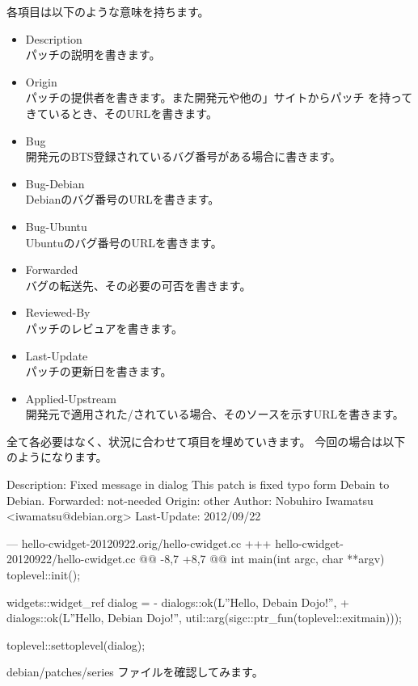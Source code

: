 \documentclass[mingoth,a4paper]{jsarticle}
\begin{document}
各項目は以下のような意味を持ちます。
\begin{itemize}
\item Description\\
パッチの説明を書きます。
\item Origin\\
パッチの提供者を書きます。また開発元や他の」サイトからパッチ
を持ってきているとき、そのURLを書きます。
\item Bug\\
開発元のBTS登録されているバグ番号がある場合に書きます。
\item Bug-Debian\\
Debianのバグ番号のURLを書きます。
\item Bug-Ubuntu\\
Ubuntuのバグ番号のURLを書きます。
\item Forwarded\\
バグの転送先、その必要の可否を書きます。
\item Reviewed-By\\
パッチのレビュアを書きます。
\item Last-Update\\
パッチの更新日を書きます。
\item Applied-Upstream \\
開発元で適用された/されている場合、そのソースを示すURLを書きます。
\end{itemize}

全て各必要はなく、状況に合わせて項目を埋めていきます。
今回の場合は以下のようになります。

\begin{commandline}
Description: Fixed message in dialog
 This patch is fixed typo form Debain to Debian.
Forwarded: not-needed
Origin: other
Author: Nobuhiro Iwamatsu <iwamatsu@debian.org>
Last-Update: 2012/09/22

--- hello-cwidget-20120922.orig/hello-cwidget.cc
+++ hello-cwidget-20120922/hello-cwidget.cc
@@ -8,7 +8,7 @@ int main(int argc, char **argv)
    toplevel::init();

    widgets::widget_ref dialog =
-       dialogs::ok(L''Hello, Debain Dojo!'',
+       dialogs::ok(L''Hello, Debian Dojo!'',
            util::arg(sigc::ptr_fun(toplevel::exitmain)));

    toplevel::settoplevel(dialog);
\end{commandline}

debian/patches/series ファイルを確認してみます。

\end{document}
